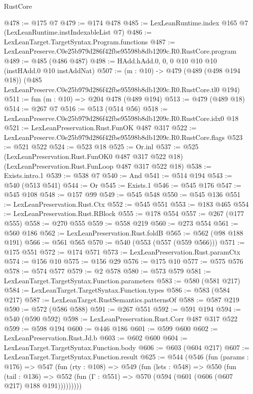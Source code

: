 \begin{lexlean}{RustCore}
\begin{coremodule}
@478 := @175 @7
@479 := @174 @478
@485 := LexLeanRuntime.index @165 @7 (LexLeanRuntime.instIndexableList @7)
@486 := LexLeanTarget.TargetSyntax.Program.functions
@487 := LexLeanPreserve.C0e25b979d286f42fbe95598b8db1209c.R0.RustCore.program
@489 := @485 (@486 @487)
@498 := HAdd.hAdd.{0, 0, 0} @10 @10 @10 (instHAdd.{0} @10 instAddNat)
@507 := (m : @10) ->
  @479
    (@489 (@498 @194 @18))
    (@485 LexLeanPreserve.C0e25b979d286f42fbe95598b8db1209c.R0.RustCore.tl0 @194)
@511 := fun (m : @10) => @204 @478 (@489 @194)
@513 := @479 (@489 @18)
@514 := @267 @7
@516 := @513 (@514 @56)
@518 := LexLeanPreserve.C0e25b979d286f42fbe95598b8db1209c.R0.RustCore.idx0 @18
@521 := LexLeanPreservation.Rust.FunOK @487 @317
@522 := LexLeanPreserve.C0e25b979d286f42fbe95598b8db1209c.R0.RustCore.flags
@523 := @521 @522
@524 := @523 @18
@525 := Or.inl
@537 := @525
    (LexLeanPreservation.Rust.FunOK0 @487 @317 @522 @18)
    (LexLeanPreservation.Rust.FunLoop @487 @317 @522 @18)
@538 := Exists.intro.{1}
@539 := @538 @7
@540 := And
@541 := @514 @194
@543 := @540 (@513 @541)
@544 := Or
@545 := Exists.{1}
@546 := @545 @176
@547 := @545 @108
@548 := @157 @99
@549 := @545 @548
@550 := @545 @136
@551 := LexLeanPreservation.Rust.Ctx
@552 := @545 @551
@553 := @183 @465
@554 := LexLeanPreservation.Rust.RBlock
@555 := @178 @554
@557 := @267 (@177 @555)
@558 := @270 @555
@559 := @558 @219
@560 := @273 @554
@561 := @560 @186
@562 := LexLeanPreservation.Rust.foldB
@565 := @562 (@98 @188 @191)
@566 := @561 @565
@570 := @540 (@553 (@557 (@559 @566)))
@571 := @175 @551
@572 := @174 @571
@573 := LexLeanPreservation.Rust.paramCtx
@574 := @156 @10
@575 := @156 @29
@576 := @175 @10
@577 := @575 @576
@578 := @574 @577
@579 := @2 @578
@580 := @573 @579
@581 := LexLeanTarget.TargetSyntax.Function.parameters
@583 := @580 (@581 @217)
@584 := LexLeanTarget.TargetSyntax.Function.types
@586 := @583 (@584 @217)
@587 := LexLeanTarget.RustSemantics.patternsOf
@588 := @587 @219
@590 := @572 (@586 @588)
@591 := @267 @551
@592 := @591 @194
@594 := @540 (@590 @592)
@598 := LexLeanPreservation.Rust.Corr @487 @317 @522
@599 := @598 @194
@600 := @446 @186
@601 := @599 @600
@602 := LexLeanPreservation.Rust.Jd.b
@603 := @602 @600
@604 := LexLeanTarget.TargetSyntax.Function.body
@606 := @603 (@604 @217)
@607 := LexLeanTarget.TargetSyntax.Function.result
@625 := @544
    (@546
      (fun (params : @176) =>
      @547
        (fun (rty : @108) =>
        @549
          (fun (lets : @548) =>
          @550
            (fun (tail : @136) =>
            @552 (fun (Γ : @551) => @570 (@594 (@601 (@606 (@607 @217) @188 @191)))))))))

\end{coremodule}
\end{lexlean}
